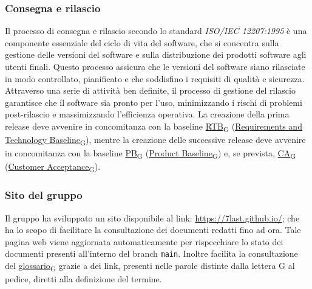 \subsubsection{Consegna e rilascio}
Il processo di consegna e rilascio secondo lo standard \textit{ISO/IEC 12207:1995} è una componente essenziale del ciclo di vita del software, che si concentra sulla gestione delle versioni del software e sulla distribuzione dei prodotti software agli utenti finali. Questo processo assicura che le versioni del software siano rilasciate in modo controllato, pianificato e che soddisfino i requisiti di qualità e sicurezza. Attraverso una serie di attività ben definite, il processo di gestione del rilascio garantisce che il software sia pronto per l'uso, minimizzando i rischi di problemi post-rilascio e massimizzando l'efficienza operativa. La creazione della prima release deve avvenire in concomitanza con la baseline \href{https://7last.github.io/docs/rtb/documentazione-interna/glossario\#requirements-and-technology-baseline}{RTB\textsubscript{G}} (\href{https://7last.github.io/docs/rtb/documentazione-interna/glossario\#requirements-and-technology-baseline}{Requirements and Technology Baseline\textsubscript{G}}), mentre la creazione delle successive release deve avvenire in concomitanza con la baseline \href{https://7last.github.io/docs/rtb/documentazione-interna/glossario\#product-baseline}{PB\textsubscript{G}} (\href{https://7last.github.io/docs/rtb/documentazione-interna/glossario\#product-baseline}{Product Baseline\textsubscript{G}}) e, se prevista, \href{https://7last.github.io/docs/rtb/documentazione-interna/glossario\#customer-acceptance}{CA\textsubscript{G}} (\href{https://7last.github.io/docs/rtb/documentazione-interna/glossario\#customer-acceptance}{Customer Acceptance\textsubscript{G}}).

\subsubsection{Sito del gruppo}
Il gruppo ha sviluppato un sito disponibile al link: \url{https://7last.github.io/}; che ha lo scopo di facilitare la consultazione dei documenti redatti fino ad ora. Tale pagina web viene aggiornata automaticamente per rispecchiare lo stato dei documenti presenti all'interno del branch \texttt{main}. Inoltre facilita la consultazione del \href{https://7last.github.io/docs/rtb/documentazione-interna/glossario\#glossario}{glossario\textsubscript{G}} grazie a dei link, presenti nelle parole distinte dalla lettera G al pedice, diretti alla definizione del termine.

